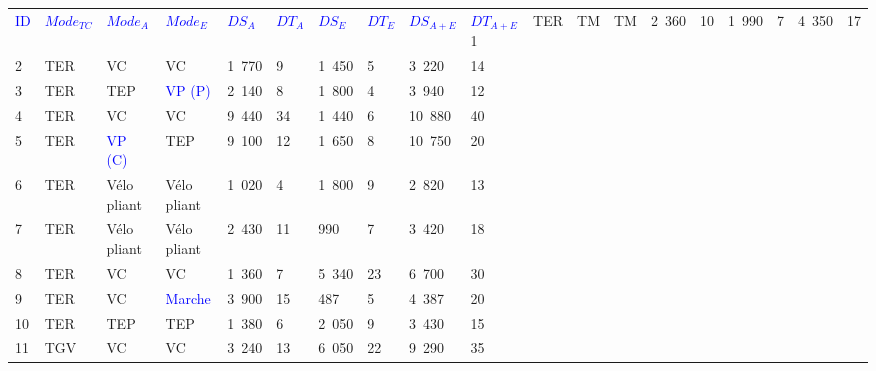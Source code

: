         \begin{longtable}{p{0.7cm}p{1.4cm}p{1.4cm}p{1.6cm}p{0.8cm}p{0.8cm}p{0.8cm}p{0.8cm}p{1.1cm}p{1.1cm}}
         \textcolor{blue}{\small{ID}} & \small{\textcolor{blue}{$Mode_{TC}$}} & \small{\textcolor{blue}{$Mode_{A}$}} & \small{\textcolor{blue}{$Mode_{E}$}} & \small{\textcolor{blue}{$DS_{A}$}} & \small{\textcolor{blue}{$DT_{A}$}} & \small{\textcolor{blue}{$DS_{E}$}} & \small{\textcolor{blue}{$DT_{E}$}} & \small{\textcolor{blue}{$DS_{A+E}$}} & \small{\textcolor{blue}{$DT_{A+E}$}}
        \hline
        \endhead
    \small{1} & \small{TER} & \small{TM} & \small{TM} & \small{2~360} & \small{10} & \small{1~990} & \small{7} & \small{4~350} & \small{17}\\
    \small{2} & \small{TER} & \small{VC} & \small{VC} & \small{1~770} & \small{9} & \small{1~450} & \small{5} & \small{3~220} & \small{14}\\
    \small{3} & \small{TER} & \small{TEP} & \small{\textcolor{blue}{VP (P)}} & \small{2~140} & \small{8} & \small{1~800} & \small{4} & \small{3~940} & \small{12}\\
    \small{4} & \small{TER} & \small{VC} & \small{VC} & \small{9~440} & \small{34} & \small{1~440} & \small{6} & \small{10~880} & \small{40}\\
    \small{5} & \small{TER} & \small{\textcolor{blue}{VP (C)}} & \small{TEP} & \small{9~100} & \small{12} & \small{1~650} & \small{8} & \small{10~750} & \small{20}\\
    \small{6} & \small{TER} & \small{Vélo pliant} & \small{Vélo pliant} & \small{1~020} & \small{4} & \small{1~800} & \small{9} & \small{2~820} & \small{13}\\
    \small{7} & \small{TER} & \small{Vélo pliant} & \small{Vélo pliant} & \small{2~430} & \small{11} & \small{990} & \small{7} & \small{3~420} & \small{18}\\
    \small{8} & \small{TER} & \small{VC} & \small{VC} & \small{1~360} & \small{7} & \small{5~340} & \small{23} & \small{6~700} & \small{30}\\
    \small{9} & \small{TER} & \small{VC} & \small{\textcolor{blue}{Marche}} & \small{3~900} & \small{15} & \small{487} & \small{5} & \small{4~387} & \small{20}\\
    \small{10} & \small{TER} & \small{TEP} & \small{TEP} & \small{1~380} & \small{6} & \small{2~050} & \small{9} & \small{3~430} & \small{15}\\
    \small{11} & \small{TGV} & \small{VC} & \small{VC} & \small{3~240} & \small{13} & \small{6~050} & \small{22} & \small{9~290} & \small{35}\\

\end{longtable}
